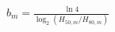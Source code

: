 \documentclass[border=8pt]{standalone}
\begin{document}
\color{ink}
$\displaystyle b_m=\frac{\ln 4}{\log_2\!\left(H_{50,m}/H_{80,m}\right)}$
\end{document}

